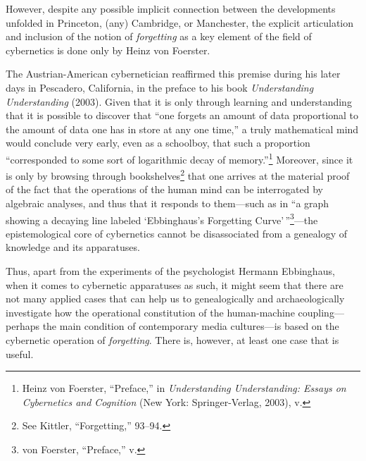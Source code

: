 \documentclass{tufte-handout}
\begin{document}
However, despite any possible implicit connection between the
developments unfolded in Princeton, (any) Cambridge, or Manchester, the
explicit articulation and inclusion of the notion of \emph{forgetting}
as a key element of the field of cybernetics is done only by Heinz von
Foerster.

The Austrian-American cybernetician reaffirmed this premise during his
later days in Pescadero, California, in the preface to his book
\emph{Understanding Understanding} (2003). Given that it is only through
learning and understanding that it is possible to discover that ``one
forgets an amount of data proportional to the amount of data one has in
store at any one time,'' a truly mathematical mind would conclude very
early, even as a schoolboy, that such a proportion ``corresponded to
some sort of logarithmic decay of memory.''\footnote{Heinz von Foerster,
  ``Preface,'' in \emph{Understanding Understanding: Essays on
  Cybernetics and Cognition} (New York: Springer-Verlag, 2003), v.}
Moreover, since it is only by browsing through bookshelves\footnote{See
  Kittler, ``Forgetting,'' 93--94.} that one arrives at the material
proof of the fact that the operations of the human mind can be
interrogated by algebraic analyses, and thus that it responds to
them---such as in ``a graph showing a decaying line labeled
`Ebbinghaus's Forgetting Curve'\,''\footnote{von Foerster, ``Preface,''
  v.}---the epistemological core of cybernetics cannot be disassociated
from a genealogy of knowledge and its apparatuses.

Thus, apart from the experiments of the psychologist Hermann Ebbinghaus,
when it comes to cybernetic apparatuses as such, it might seem that
there are not many applied cases that can help us to genealogically and
archaeologically investigate how the operational constitution of the
human-machine coupling---perhaps the main condition of contemporary
media cultures---is based on the cybernetic operation of
\emph{forgetting}. There is, however, at least one case that is useful.
\end{document}

